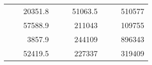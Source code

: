 \begin{table}[H]
\begin{tabular}{|ccrccrccc}
\rowcolor[HTML]{DDFDFF} 
\multicolumn{1}{|c|}{\cellcolor[HTML]{FFFFC7}}                                & \multicolumn{1}{c|}{\cellcolor[HTML]{DDFDFF}}                      & \multicolumn{1}{r|}{\cellcolor[HTML]{DAE8FC}20351.8}   & \multicolumn{1}{c|}{\cellcolor[HTML]{FFFFC7}}                                & \multicolumn{1}{c|}{\cellcolor[HTML]{DDFDFF}}                       & \multicolumn{1}{r|}{\cellcolor[HTML]{DDFDFF}51063.5}   & \multicolumn{1}{c|}{\cellcolor[HTML]{FFFFC7}}                                & \multicolumn{1}{c|}{\cellcolor[HTML]{DDFDFF}}                      & \multicolumn{1}{r|}{\cellcolor[HTML]{DDFDFF}510577}    \\ \cline{3-3} \cline{6-6} \cline{9-9} 
\multicolumn{1}{|c|}{\cellcolor[HTML]{FFFFC7}}                                & \multicolumn{1}{c|}{\cellcolor[HTML]{DDFDFF}}                      & \multicolumn{1}{r|}{\cellcolor[HTML]{DDFDFF}57588.9}   & \multicolumn{1}{c|}{\cellcolor[HTML]{FFFFC7}}                                & \multicolumn{1}{c|}{\cellcolor[HTML]{DDFDFF}}                       & \multicolumn{1}{r|}{\cellcolor[HTML]{DAE8FC}211043}    & \multicolumn{1}{c|}{\cellcolor[HTML]{FFFFC7}}                                & \multicolumn{1}{c|}{\cellcolor[HTML]{DDFDFF}}                      & \multicolumn{1}{r|}{\cellcolor[HTML]{DAE8FC}109755}    \\ \cline{3-3} \cline{6-6} \cline{9-9} 
\rowcolor[HTML]{DDFDFF} 
\multicolumn{1}{|c|}{\cellcolor[HTML]{FFFFC7}}                                & \multicolumn{1}{c|}{\cellcolor[HTML]{DDFDFF}}                      & \multicolumn{1}{r|}{\cellcolor[HTML]{DAE8FC}3857.9}    & \multicolumn{1}{c|}{\cellcolor[HTML]{FFFFC7}}                                & \multicolumn{1}{c|}{\cellcolor[HTML]{DDFDFF}}                       & \multicolumn{1}{r|}{\cellcolor[HTML]{DDFDFF}244109}    & \multicolumn{1}{c|}{\cellcolor[HTML]{FFFFC7}}                                & \multicolumn{1}{c|}{\cellcolor[HTML]{DDFDFF}}                      & \multicolumn{1}{r|}{\cellcolor[HTML]{DDFDFF}896343}    \\ \cline{3-3} \cline{6-6} \cline{9-9} 
\multicolumn{1}{|c|}{\cellcolor[HTML]{FFFFC7}}                                & \multicolumn{1}{c|}{\cellcolor[HTML]{DDFDFF}}                      & \multicolumn{1}{r|}{\cellcolor[HTML]{DDFDFF}52419.5}   & \multicolumn{1}{c|}{\cellcolor[HTML]{FFFFC7}}                                & \multicolumn{1}{c|}{\cellcolor[HTML]{DDFDFF}}                       & \multicolumn{1}{r|}{\cellcolor[HTML]{DAE8FC}227337}    & \multicolumn{1}{c|}{\cellcolor[HTML]{FFFFC7}}                                & \multicolumn{1}{c|}{\cellcolor[HTML]{DDFDFF}}                      & \multicolumn{1}{r|}{\cellcolor[HTML]{DAE8FC}319409}    \\ \cline{3-3} \cline{6-6} \cline{9-9} 

\end{tabular}
\end{table}
